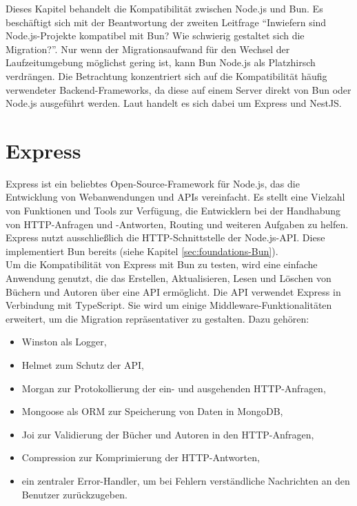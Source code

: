   \label{compabitility}
Dieses Kapitel behandelt die Kompatibilität zwischen Node.js und Bun. Es beschäftigt sich mit der Beantwortung der zweiten Leitfrage ``Inwiefern sind Node.js-Projekte kompatibel mit Bun? Wie schwierig gestaltet sich die Migration?''. Nur wenn der Migrationsaufwand für den Wechsel der Laufzeitumgebung möglichst gering ist, kann Bun Node.js als Platzhirsch verdrängen. Die Betrachtung konzentriert sich auf die Kompatibilität häufig verwendeter Backend-Frameworks, da diese auf einem Server direkt von Bun oder Node.js ausgeführt werden. Laut \cite{Greif.2022} handelt es sich dabei um Express und NestJS.

\section{Express} \label{sec:compabitility-express}
Express ist ein beliebtes Open-Source-Framework für Node.js, das die Entwicklung von Webanwendungen und APIs vereinfacht. Es stellt eine Vielzahl von Funktionen und Tools zur Verfügung, die Entwicklern bei der Handhabung von HTTP-Anfragen und -Antworten, Routing und weiteren Aufgaben zu helfen. Express nutzt ausschließlich die HTTP-Schnittstelle der Node.js-API. Diese implementiert Bun bereits (siehe Kapitel \ref{sec:foundations-Bun}).\cite{Brown.November2019}\\

\noindent 
Um die Kompatibilität von Express mit Bun zu testen, wird eine einfache Anwendung genutzt, die das Erstellen, Aktualisieren, Lesen und Löschen von Büchern und Autoren über eine API ermöglicht. Die API verwendet Express in Verbindung mit TypeScript. Sie wird um einige Middleware-Funktionalitäten erweitert, um die Migration repräsentativer zu gestalten. Dazu gehören:
\begin{itemize}
	\item Winston als Logger,
	\item Helmet zum Schutz der API,
	\item Morgan zur Protokollierung der ein- und ausgehenden HTTP-Anfragen,
	\item Mongoose als ORM zur Speicherung von Daten in MongoDB, 
	\item Joi zur Validierung der Bücher und Autoren in den HTTP-Anfragen,
	\item Compression zur Komprimierung der HTTP-Antworten,
	\item ein zentraler Error-Handler, um bei Fehlern verständliche Nachrichten an den Benutzer zurückzugeben.
\end{itemize}
	
